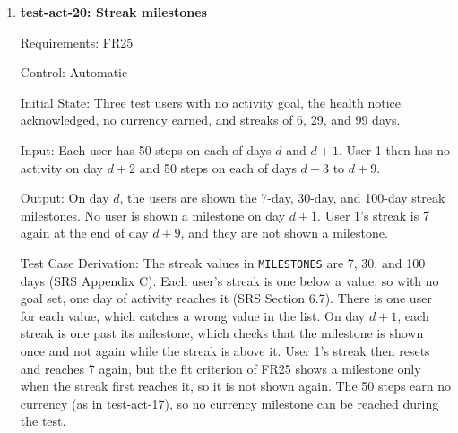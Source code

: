 \documentclass[12pt, titlepage]{article}
\begin{document}
\begin{enumerate}
Output: At the end of day $d$, the balance is 540 and the user holds 3 shares.
At the start of day $d+1$, the streak is 0, the balance is still 540, the user
still holds 3 shares, and the friend's social feed is the same as at the start
of day $d$.

Test Case Derivation: The user misses their goal on day $d$ and does not take
a rest day, so the streak ends (SRS Section 6.7), which is the case in the fit
criterion of FR24. The streak starts at 5 so that there is a streak to end.
The balance and holdings start above 0 so that a reduction would show. The
day's steps still earn $\lfloor 4000 / 100 \rfloor = 40$, as they would with
no goal set (Hazard Analysis, SAF-2), so the balance at the end of day $d$ is
540, and FR24 requires the same balance and holdings at the start of day
$d+1$. Holdings are compared as numbers of shares, so a change in the stock's
price cannot affect the result. The user has already shared their streak, so
there is an update that could reveal the ended streak. The user shares nothing
on day $d$, so the friend's feed should not change. Comparing the whole feed
catches a new update about the missed goal or the ended streak, and also the
shared streak being changed to 0.

How test will be performed: A pytest test sends day $d$'s total, reads the
balance and holdings, moves the backend's clock to day $d+1$, and reads the
streak, balance, holdings, and the friend's feed through the API.

\item{\textbf{test-act-20: Streak milestones}\\}

Requirements: FR25

Control: Automatic

Initial State: Three test users with no activity goal, the health notice
acknowledged, no currency earned, and streaks of 6, 29, and 99 days.

Input: Each user has 50 steps on each of days $d$ and $d+1$. User 1 then has
no activity on day $d+2$ and 50 steps on each of days $d+3$ to $d+9$.

Output: On day $d$, the users are shown the 7-day, 30-day, and 100-day streak
milestones. No user is shown a milestone on day $d+1$. User 1's streak is 7
again at the end of day $d+9$, and they are not shown a milestone.

Test Case Derivation: The streak values in \texttt{MILESTONES} are 7, 30, and
100 days (SRS Appendix C). Each user's streak is one below a value, so with no
goal set, one day of activity reaches it (SRS Section 6.7). There is one user
for each value, which catches a wrong value in the list. On day $d+1$, each
streak is one past its milestone, which checks that the milestone is shown
once and not again while the streak is above it. User 1's streak then resets
and reaches 7 again, but the fit criterion of FR25 shows a milestone only when
the streak first reaches it, so it is not shown again. The 50 steps earn no
currency (as in test-act-17), so no currency milestone can be reached during
the test.


\end{enumerate}
\end{document}
